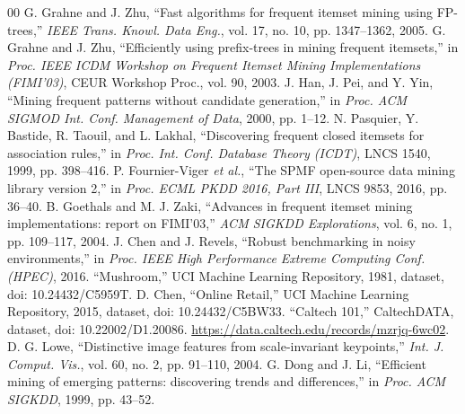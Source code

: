 \documentclass[conference]{IEEEtran}
\begin{document}
\begin{thebibliography}{00}
 G. Grahne and J. Zhu, ``Fast algorithms for frequent itemset mining using FP-trees,''
\textit{IEEE Trans. Knowl. Data Eng.}, vol. 17, no. 10, pp. 1347--1362, 2005.
 G. Grahne and J. Zhu, ``Efficiently using prefix-trees in mining frequent itemsets,'' in
\textit{Proc. IEEE ICDM Workshop on Frequent Itemset Mining Implementations (FIMI'03)}, CEUR Workshop Proc., vol. 90, 2003.
 J. Han, J. Pei, and Y. Yin, ``Mining frequent patterns without candidate generation,'' in
\textit{Proc. ACM SIGMOD Int. Conf. Management of Data}, 2000, pp. 1--12.
 N. Pasquier, Y. Bastide, R. Taouil, and L. Lakhal, ``Discovering frequent closed itemsets for
association rules,'' in \textit{Proc. Int. Conf. Database Theory (ICDT)}, LNCS 1540, 1999, pp. 398--416.
 P. Fournier-Viger \textit{et al.}, ``The SPMF open-source data mining library version 2,'' in
\textit{Proc. ECML PKDD 2016, Part III}, LNCS 9853, 2016, pp. 36--40.
 B. Goethals and M. J. Zaki, ``Advances in frequent itemset mining implementations: report on
FIMI'03,'' \textit{ACM SIGKDD Explorations}, vol. 6, no. 1, pp. 109--117, 2004.
 J. Chen and J. Revels, ``Robust benchmarking in noisy environments,'' in \textit{Proc. IEEE High
Performance Extreme Computing Conf. (HPEC)}, 2016.
 ``Mushroom,'' UCI Machine Learning Repository, 1981, dataset, doi: 10.24432/C5959T.
 D. Chen, ``Online Retail,'' UCI Machine Learning Repository, 2015, dataset, doi: 10.24432/C5BW33.
 ``Caltech 101,'' CaltechDATA, dataset, doi: 10.22002/D1.20086.
\url{https://data.caltech.edu/records/mzrjq-6wc02}.
 D. G. Lowe, ``Distinctive image features from scale-invariant keypoints,''
\textit{Int. J. Comput. Vis.}, vol. 60, no. 2, pp. 91--110, 2004.
 G. Dong and J. Li, ``Efficient mining of emerging patterns: discovering trends and
differences,'' in \textit{Proc. ACM SIGKDD}, 1999, pp. 43--52.
\end{thebibliography}

\end{document}
